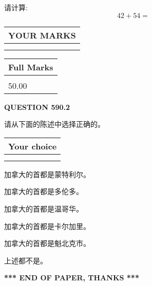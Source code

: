 \documentclass{ctexart}
\begin{document}
  
 
请计算:
\begin{equation}
42 +  %
54 = \nonumber
\end{equation}
 

 

 
  
\vspace{0.2in}
  
\noindent\begin{tabular}{|l|}
\hline
 YOUR MARKS  \\
\hline
 \\ 
 \\ 
\hline
\end{tabular}
\hspace{0.05in} \begin{tabular}{|l|}
\hline
 Full Marks  \\
\hline
 \\ 
50.00 \\
\hline
\end{tabular}
{\textbf{\Large{QUESTION
590.2 
}}}
  
  
请从下面的陈述中选择正确的。
  
  
\noindent\hspace{3.0in} \begin{tabular}{|l|}
\hline
Your choice \\
\hline
 \\ 
 \\ 
\hline
\end{tabular}
  
  
 
 
加拿大的首都是蒙特利尔。
 
 
加拿大的首都是多伦多。
 
 
加拿大的首都是温哥华。
 
 
加拿大的首都是卡尔加里。
 
 
加拿大的首都是魁北克市。
 
 
 上述都不是。
 
 
   
   
 \vspace{0.2in}
 
   
   
   
   
\vspace{1.0in} 
{\textbf{\large{ *** END OF PAPER, THANKS *** }}} 
   
\end{document}
